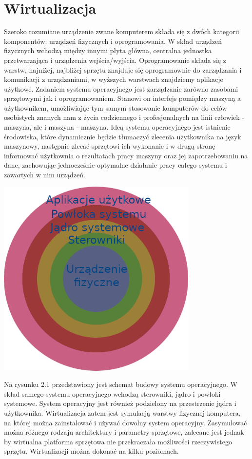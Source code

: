 \documentclass[polish, a4paper, 12pt, oneside]{book}
\begin{document}
\section{Wirtualizacja}
Szeroko rozumiane urządzenie zwane komputerem składa się z dwóch kategorii komponentów: urządzeń fizycznych i oprogramowania. W skład urządzeń fizycznych wchodzą między innymi płyta główna, centralna jednostka przetwarzająca i urządzenia wejścia/wyjścia. Oprogramowanie składa się z warstw, najniżej, najbliżej sprzętu znajduje się oprogramownie do zarządzania i komunikacji z urządzaniami, w wyższych warstwach znajdziemy aplikacje użytkowe. Zadaniem systemu operacyjnego jest zarządzanie zarówno zasobami sprzętowymi jak i oprogramowaniem. Stanowi on interfejs pomiędzy maszyną a użytkownikem, umożliwiając tym samym stosowanie komputerów do celów osobistych znanych nam z życia codziennego i profesjonalnych na linii człowiek - maszyna, ale i maszyna - maszyna. Ideą systemu operacyjnego jest istnienie środowiska, które dynamicznie będzie tłumaczyć zlecenia użytkownika na język maszynowy, następnie zlecać sprzętowi ich wykonanie i w drugą stronę informować użytkownia o rezultatach pracy maszyny oraz jej zapotrzebowaniu na dane, zachowując jednocześnie optymalne działanie pracy całego systemu i zawartych w nim urządzeń.
   
\begin{center}
\includegraphics[height=100mm]{schemat_os.png}
\end{center}

Na rysunku 2.1 przedstawiony jest schemat budowy systemu operacyjnego. W skład samego systemu operacyjnego wchodzą sterowniki, jądro i powłoki systemowe. System operacyjny jest również podzielony na przestrzenie jądra i użytkownika. Wirtualizacja zatem jest symulacją warstwy fizycznej komputera, na której można zainstalować i używać dowolny system operacyjny. Zasymulować można różnego rodzaju architektury i parametry sprzętowe, zalecane jest jednak by wirtualna platforma sprzętowa nie przekraczała możliwości rzeczywistego sprzętu. Wirtualizacji można dokonać na kilku poziomach. 
\end{document}
